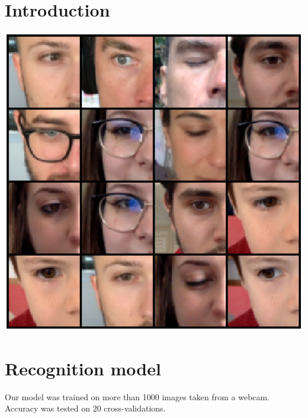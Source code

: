 \documentclass[a0,portrait]{a0poster}
\begin{document}
\begin{multicols}{3}
\section*{Introduction}
\includegraphics[width=1.\linewidth]{dataset.pdf}
\color{Black} %
\section*{Recognition model} %

Our model was trained on more than 1000 images taken from a webcam. Accuracy was tested on 20 cross-validations.


\end{multicols}
\end{document}
